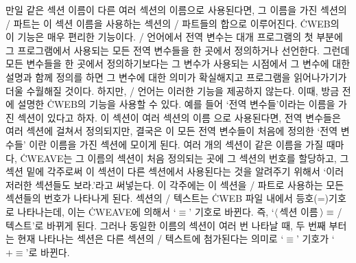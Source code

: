 만일 같은 섹션 이름이 다른 여러 섹션의 이름으로 사용된다면, 그 이름을 가진 섹션의
\CEE/ 파트는 이 섹션 이름을 사용하는 섹션의 \CEE/ 파트들의 합으로 이루어진다. \.{CWEB}의
이 기능은 매우 편리한 기능이다. \CEE/ 언어에서 전역 변수는 대개 프로그램의 첫 부분에 그
프로그램에서 사용되는 모든 전역 변수들을 한 곳에서 정의하거나 선언한다. 그런데 모든 변수들을
한 곳에서 정의하기보다는 그 변수가 사용되는 시점에서 그 변수에 대한 설명과 함께 정의를 하면
그 변수에 대한 의미가 확실해지고 프로그램을 읽어나가기가 더울 수월해질 것이다. 하지만, \CEE/
언어는 이러한 기능을 제공하지 않는다. 이때, 방금 전에 설명한 \.{CWEB}의 기능을 사용할 수
있다. 예를 들어 `전역 변수들'이라는 이름을 가진 섹션이 있다고 하자. 이 섹션이 여러 섹션의 이름
으로 사용된다면, 전역 변수들은 여러 섹션에 걸쳐서 정의되지만, 결국은 이 모든 전역 변수들이
처음에 정의한 `전역 변수들' 이란 이름을 가진 섹션에 모이게 된다. 여러 개의 섹션이 같은 이름을
가질 때마다, \.{CWEAVE}는 그 이름의 섹션이 처음 정의되는 곳에 그 섹션의 번호를 할당하고,
그 섹션 밑에 각주로써 이 섹션이 다른 섹션에서 사용된다는 것을 알려주기 위해서
`이러저러한 섹션들도 보라.'라고 써넣는다. 이 각주에는 이 섹션을 \CEE/ 파트로
사용하는 모든 섹션들의 번호가 나타나게 된다. 섹션의 \CEE/ 텍스트는 \.{CWEB} 파일 내에서
등호(=)기호로 나타나는데, 이는 \.{CWEAVE}에 의해서 `$\equiv$' 기호로 바뀐다.
즉, `$\langle\,$섹션 이름$\,\rangle\equiv\null$\CEE/ 텍스트'로 바뀌게 된다.
그러나 동일한 이름의 섹션이 여러 번 나타날 때, 두 번째 부터는 현재 나타나는 섹션은
다른 섹션의 \CEE/ 텍스트에 첨가된다는 의미로 `$\equiv$' 기호가 `$\mathrel+\equiv$'로
바뀐다.

